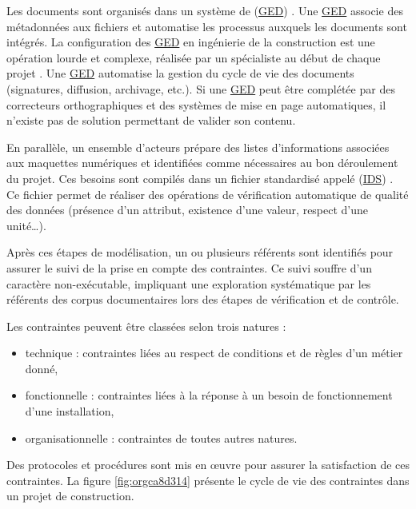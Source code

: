 \documentclass[a4paper,12pt]{article}
\begin{document}
Les documents sont organisés dans un système de  (\protect\hyperlink{gls-6}{\label{gls-6-use-1}GED}) \autocite{pimoMisePlaceSolutions2021a}. Une \protect\hyperlink{gls-6}{\label{gls-6-use-2}GED} associe des  métadonnées aux fichiers et automatise les processus auxquels les documents sont intégrés. La configuration des \protect\hyperlink{gls-6}{\label{gls-6-use-3}GED} en ingénierie de la construction est une opération lourde et complexe, réalisée par un spécialiste au début de chaque projet \autocite{bjorkElectronicDocumentManagement2006a}. Une \protect\hyperlink{gls-6}{\label{gls-6-use-4}GED}  automatise la gestion du cycle de vie des documents (signatures, diffusion, archivage, etc.). Si une \protect\hyperlink{gls-6}{\label{gls-6-use-5}GED} peut être complétée par des correcteurs orthographiques et des systèmes de mise en page automatiques, il n'existe pas de solution permettant de valider son contenu.

En parallèle, un ensemble d’acteurs prépare des listes d’informations associées aux maquettes numériques et identifiées comme nécessaires au bon déroulement du projet. Ces besoins sont compilés dans un fichier standardisé appelé  (\protect\hyperlink{gls-7}{\label{gls-7-use-1}IDS}) \autocite{InformationDeliverySpecification2024a}. Ce fichier permet de réaliser des opérations de vérification automatique de qualité des données (présence d’un attribut, existence d’une valeur, respect d’une unité…).

Après ces étapes de modélisation, un ou plusieurs référents sont identifiés pour assurer le suivi de la prise en compte des contraintes. Ce suivi souffre d'un caractère non-exécutable, impliquant une exploration systématique par les référents  des corpus documentaires lors des étapes de vérification et de contrôle.

Les contraintes peuvent être classées selon trois natures :
\begin{itemize}
\item technique : contraintes liées au respect de conditions et de règles d'un métier donné,
\item fonctionnelle : contraintes liées à la réponse à un besoin de fonctionnement d'une installation,
\item organisationnelle : contraintes de toutes autres natures.
\end{itemize}

Des protocoles et procédures sont mis en œuvre pour assurer la satisfaction de ces contraintes. La figure \ref{fig:orgca8d314} présente le cycle de vie des contraintes dans un projet de construction.
\end{document}
